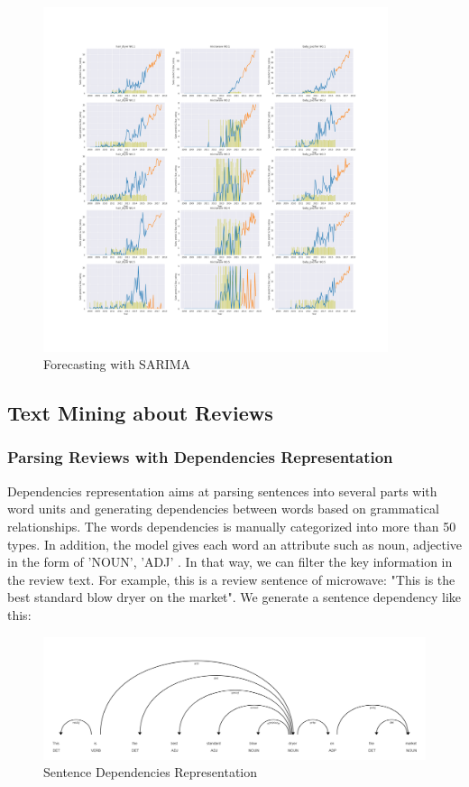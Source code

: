 \documentclass[12pt]{article}  %
\begin{document}
\begin{figure}[H]
\centering
\includegraphics[width=0.9\textwidth]{Forecasting_ARIMA .png}
\caption{Forecasting with SARIMA}\label{fig:Forecasting ARIMA}
\end{figure}



\subsection{Text Mining about Reviews}
\subsubsection{Parsing Reviews with Dependencies Representation}

Dependencies representation aims at parsing sentences into several parts with word units and generating dependencies between words based on grammatical relationships. The words dependencies is manually categorized into more than 50 types. In addition, the model gives each word an attribute such as noun, adjective in the form of 'NOUN', 'ADJ' \cite{4}. In that way, we can filter the key information in the review text. For example, this is a review sentence of microwave: "This is the best standard blow dryer on the market". We generate a sentence dependency like this:

\begin{figure}[H]
\centering
\includegraphics[width=.8\textwidth]{Stanford.png}
\caption{Sentence Dependencies Representation}\label{fig:sentence}
\end{figure}
\end{document}
